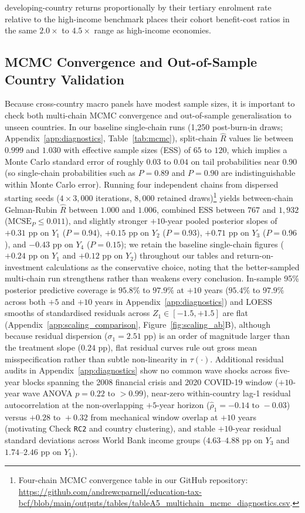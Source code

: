 \documentclass[11pt,a4paper]{article}
\begin{document}
developing-country returns proportionally by their tertiary enrolment rate relative to the high-income benchmark places their cohort benefit-cost ratios in the same $2.0\times$ to $4.5\times$ range as high-income economies.

\subsection{MCMC Convergence and Out-of-Sample Country Validation}
\label{sec:holdout}

Because cross-country macro panels have modest sample sizes, it is important to check both multi-chain MCMC convergence and out-of-sample generalisation to unseen countries. In our baseline single-chain runs (1,250 post-burn-in draws; Appendix~\ref{app:diagnostics}, Table~\ref{tab:mcmc}), split-chain $\hat{R}$ values lie between $0.999$ and $1.030$ with effective sample sizes (ESS) of $65$ to $120$, which implies a Monte Carlo standard error of roughly $0.03$ to $0.04$ on tail probabilities near $0.90$ (so single-chain probabilities such as $P = 0.89$ and $P = 0.90$ are indistinguishable within Monte Carlo error). Running four independent chains from dispersed starting seeds ($4 \times 3,000$ iterations, $8,000$ retained draws)\footnote{\label{fn:multichain}\raggedright Four-chain MCMC convergence table in our GitHub repository: \url{https://github.com/andrewcparnell/education-tax-bcf/blob/main/outputs/tables/tableA5_multichain_mcmc_diagnostics.csv}.} yields between-chain Gelman-Rubin $\hat{R}$ between $1.000$ and $1.006$, combined $\text{ESS}$ between $767$ and $1,932$ ($\text{MCSE}_P \le 0.011$), and slightly stronger $+10$-year pooled posterior slopes of $+0.31$ pp on $Y_1$ ($P = 0.94$), $+0.15$ pp on $Y_2$ ($P = 0.93$), $+0.71$ pp on $Y_3$ ($P = 0.96$), and $-0.43$ pp on $Y_4$ ($P = 0.15$); we retain the baseline single-chain figures ($+0.24$ pp on $Y_1$ and $+0.12$ pp on $Y_2$) throughout our tables and return-on-investment calculations as the conservative choice, noting that the better-sampled multi-chain run strengthens rather than weakens every conclusion. In-sample 95\% posterior predictive coverage is $95.8\%$ to $97.9\%$ at $+10$ years ($95.4\%$ to $97.9\%$ across both $+5$ and $+10$ years in Appendix~\ref{app:diagnostics}) and LOESS smooths of standardised residuals across $Z_1 \in [-1.5, +1.5]$ are flat (Appendix~\ref{app:scaling_comparison}, Figure~\ref{fig:scaling_ab}B), although because residual dispersion ($\sigma_1 = 2.51$ pp) is an order of magnitude larger than the treatment slope ($0.24$ pp), flat residual curves rule out gross mean misspecification rather than subtle non-linearity in $\tau(\cdot)$. Additional residual audits in Appendix~\ref{app:diagnostics} show no common wave shocks across five-year blocks spanning the 2008 financial crisis and 2020 COVID-19 window ($+10$-year wave ANOVA $p = 0.22\text{ to }>0.99$), near-zero within-country lag-1 residual autocorrelation at the non-overlapping $+5$-year horizon ($\hat{\rho}_1 = -0.14\text{ to }-0.03$) versus $+0.28\text{ to }+0.32$ from mechanical window overlap at $+10$ years (motivating Check \texttt{RC2} and country clustering), and stable $+10$-year residual standard deviations across World Bank income groups ($4.63\text{--}4.88$ pp on $Y_3$ and $1.74\text{--}2.46$ pp on $Y_1$).
\end{document}
